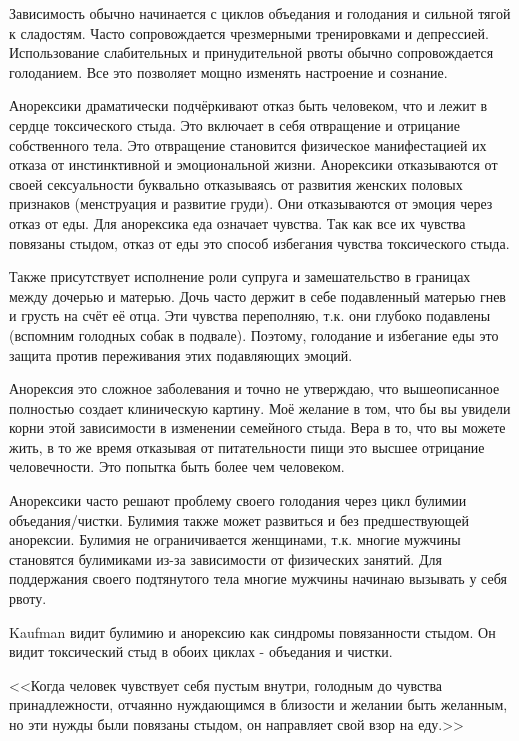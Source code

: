 \documentclass[10pt, fleqn]{article}
\begin{document}
Зависимость обычно начинается с циклов объедания и голодания и сильной тягой к сладостям. Часто сопровождается чрезмерными тренировками и депрессией. Использование слабительных и принудительной рвоты обычно сопровождается голоданием. Все это позволяет мощно изменять настроение и сознание.

Анорексики драматически подчёркивают отказ быть человеком, что и лежит в сердце токсического стыда. Это включает в себя отвращение и отрицание собственного тела. Это отвращение становится физическое манифестацией их отказа от инстинктивной и эмоциональной жизни. Анорексики отказываются от своей сексуальности буквально отказываясь от развития женских половых признаков (менструация и развитие груди). Они отказываются от эмоция через отказ от еды. Для анорексика еда означает чувства. Так как все их чувства повязаны стыдом, отказ от еды это способ избегания чувства токсического стыда.

Также присутствует исполнение роли супруга и замешательство в границах между дочерью и матерью. Дочь часто держит в себе подавленный матерью гнев и грусть на счёт её отца. Эти чувства переполняю, т.к. они глубоко подавлены (вспомним голодных собак в подвале). Поэтому, голодание и избегание еды это защита против переживания этих подавляющих эмоций.

Анорексия это сложное заболевания и точно не утверждаю, что вышеописанное полностью создает клиническую картину. Моё желание в том, что бы вы увидели корни этой зависимости в изменении семейного стыда. Вера в то, что вы можете жить, в то же время отказывая от питательности пищи это высшее отрицание человечности. Это попытка быть более чем человеком.


Анорексики часто решают проблему своего голодания через цикл булимии объедания/чистки. Булимия также может развиться и без предшествующей анорексии. Булимия не ограничивается женщинами, т.к. многие мужчины становятся булимиками из-за зависимости от физических занятий. Для поддержания своего подтянутого тела многие мужчины начинаю вызывать у себя рвоту.

Kaufman видит булимию и анорексию как синдромы повязанности стыдом. Он видит токсический стыд в обоих циклах - объедания и чистки.

<<Когда человек чувствует себя пустым внутри, голодным до чувства принадлежности, отчаянно нуждающимся в близости и желании быть желанным, но эти нужды были повязаны стыдом, он направляет свой взор на еду.>>
\end{document}
